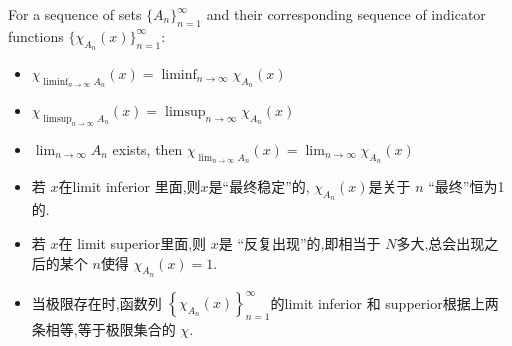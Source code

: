 \documentclass[../main.tex]{subfiles}
\begin{document}
\begin{proposition}{}{}
    For a sequence of sets $\{A_n\}_{n=1}^\infty$ and their corresponding sequence of indicator functions $\{\chi_{A_n}(x)\}_{n=1}^\infty$:
    \begin{itemize}
        \item 
$\chi_{\liminf_{n \to \infty} A_n}(x) = \liminf_{n \to \infty} \chi_{A_n}(x)$
\item $\chi_{\limsup_{n \to \infty} A_n}(x) = \limsup_{n \to \infty} \chi_{A_n}(x)$
\item  $\lim_{n \to \infty} A_n$ exists, then
$\chi_{\lim_{n \to \infty} A_n}(x) = \lim_{n \to \infty} \chi_{A_n}(x)$
    \end{itemize}
    
\end{proposition}
\begin{proofsketch}
    \begin{itemize}
        \item 若 \(  x  \)在limit inferior 里面,则\(  x  \)是“最终稳定”的, \(  \chi _{A_{n}}\left( x \right)   \)是关于 \(  n  \) “最终”恒为1的.
        \item 若 \(  x  \)在 limit superior里面,则 \(  x  \)是  “反复出现”的,即相当于 \(  N  \)多大,总会出现之后的某个 \(  n  \)使得 \(  \chi _{A_{n}}\left( x \right)= 1   \).
        \item 当极限存在时,函数列 \(  \left\{ \chi _{A_{n}}\left( x \right)  \right\}_{n = 1}^{\infty}  \)的limit inferior 和 supperior根据上两条相等,等于极限集合的 \(  \chi   \). 
    \end{itemize}
    
\end{proofsketch}
\end{document}
